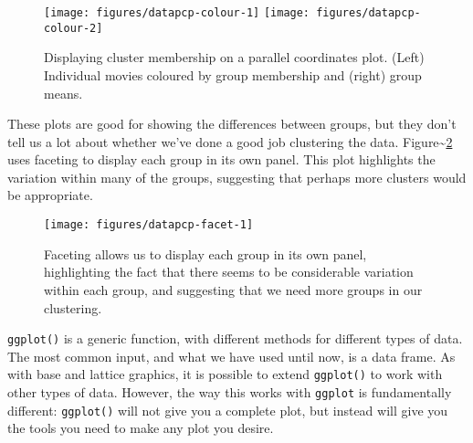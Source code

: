 \begin{figure}

{\centering \texttt{[image: figures/datapcp-colour-1]} \texttt{[image: figures/datapcp-colour-2]} 

}

\caption{Displaying cluster membership on a parallel coordinates plot. (Left) Individual movies coloured by group membership and (right) group means.\label{fig:pcp-colour}}
\end{figure}

These plots are good for showing the differences between groups, but
they don't tell us a lot about whether we've done a good job clustering
the data. Figure\textasciitilde{}\ref{fig:pcp-facet} uses faceting to
display each group in its own panel. This plot highlights the variation
within many of the groups, suggesting that perhaps more clusters would
be appropriate.

\begin{Shaded}
\begin{Highlighting}[]
\StringTok{ }\NormalTok{(}  \NormalTok{/}\NormalTok{) +}
\StringTok{  }\NormalTok{(~}\StringTok{ }
\end{Highlighting}
\end{Shaded}

\begin{figure}

{\centering \texttt{[image: figures/datapcp-facet-1]} 

}

\caption{Faceting allows us to display each group in its own panel, highlighting the fact that there seems to be considerable variation within each group, and suggesting that we need more groups in our clustering.\label{fig:pcp-facet}}
\end{figure}


\texttt{ggplot()} is a generic function, with different methods for
different types of data. The most common input, and what we have used
until now, is a data frame. As with base and lattice graphics, it is
possible to extend \texttt{ggplot()} to work with other types of data.
However, the way this works with \texttt{ggplot} is fundamentally
different: \texttt{ggplot()} will not give you a complete plot, but
instead will give you the tools you need to make any plot you desire.

